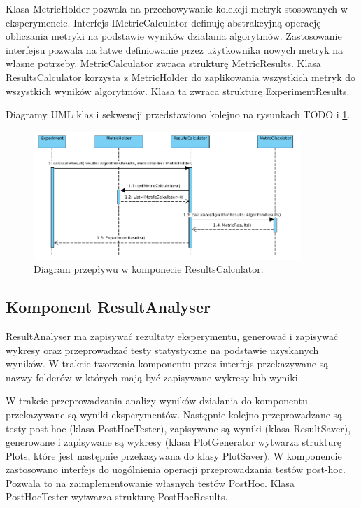 \documentclass[12pt]{article}
\begin{document}
Klasa MetricHolder pozwala na przechowywanie kolekcji metryk stosowanych w eksperymencie. Interfejs IMetricCalculator definuję abstrakcyjną operację obliczania metryki na podstawie wyników działania algorytmów. Zastosowanie interfejsu pozwala na łatwe definiowanie przez użytkownika nowych metryk na własne potrzeby. MetricCalculator zwraca strukturę MetricResults. Klasa ResultsCalculator korzysta z MetricHolder do zaplikowania wszystkich metryk do wszystkich wyników algorytmów. Klasa ta zwraca strukturę ExperimentResults.


Diagramy UML klas i sekwencji przedstawiono kolejno na rysunkach TODO i \ref{fig:sequenceResultsCalculator}.

\begin{figure}
	\centering
	\includegraphics[width=0.9\textwidth]{img/sequenceResultsCalculator.png}
	\caption{Diagram przepływu w komponecie ResultsCalculator.}
	\label{fig:sequenceResultsCalculator}
\end{figure}

\subsection{Komponent ResultAnalyser}

ResultAnalyser ma zapisywać rezultaty eksperymentu, generować i zapisywać wykresy oraz przeprowadzać testy statystyczne na podstawie uzyskanych wyników. W trakcie tworzenia komponentu przez interfejs przekazywane są nazwy folderów w których mają być zapisywane wykresy lub wyniki. 

W trakcie przeprowadzania analizy wyników działania do komponentu przekazywane są wyniki eksperymentów. Następnie kolejno przeprowadzane są testy post-hoc (klasa PostHocTester), zapisywane są wyniki (klasa ResultSaver), generowane i zapisywane są wykresy (klasa PlotGenerator wytwarza strukturę Plots, które jest następnie przekazywana do klasy PlotSaver). W komponencie zastosowano interfejs do uogólnienia operacji przeprowadzania testów post-hoc. Pozwala to na zaimplementowanie własnych testów PostHoc. Klasa PostHocTester wytwarza strukturę PostHocResults.
\end{document}
